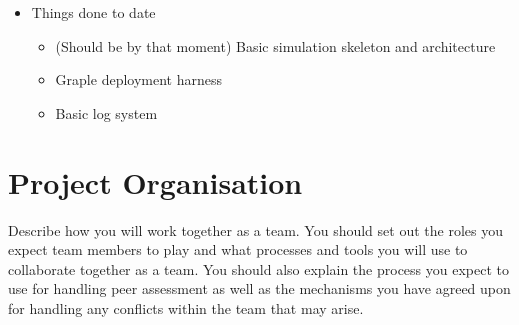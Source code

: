 \begin{itemize}
\begin{itemize}
	\end{itemize}

	\item Things done to date
	\begin{itemize}
		\item (Should be by that moment) Basic simulation skeleton and architecture
		\item Graple deployment harness
		\item Basic log system
	\end{itemize}

\end{itemize}

\section{Project Organisation} %
Describe how you will work together as a team. You should set out the roles you expect team members to play and what
processes and tools you will use to collaborate together as a team. You should also explain the process you expect to
use for handling peer assessment as well as the mechanisms you have agreed upon for handling any conflicts within the
team that may arise.

